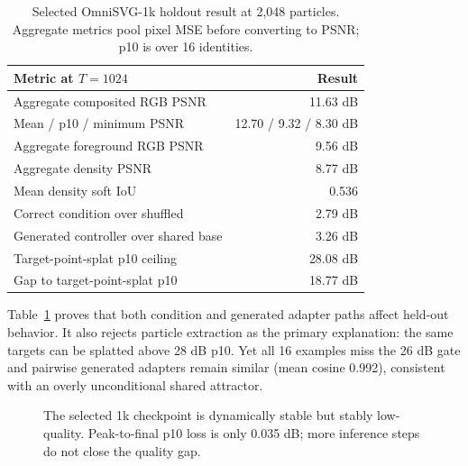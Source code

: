 \documentclass[sigconf,nonacm]{acmart}
\begin{document}
\begin{table}[t]
\caption{Selected OmniSVG-1k holdout result at 2,048 particles. Aggregate
metrics pool pixel MSE before converting to PSNR; p10 is over 16 identities.}
\label{tab:omnisvg-main}
\centering
\small
\begin{tabular}{lr}
\toprule
Metric at $T=1024$ & Result \\
\midrule
Aggregate composited RGB PSNR & 11.63 dB \\
Mean / p10 / minimum PSNR & 12.70 / 9.32 / 8.30 dB \\
Aggregate foreground RGB PSNR & 9.56 dB \\
Aggregate density PSNR & 8.77 dB \\
Mean density soft IoU & 0.536 \\
Correct condition over shuffled & 2.79 dB \\
Generated controller over shared base & 3.26 dB \\
Target-point-splat p10 ceiling & 28.08 dB \\
Gap to target-point-splat p10 & 18.77 dB \\
\bottomrule
\end{tabular}
\end{table}

Table~\ref{tab:omnisvg-main} proves that both condition and generated adapter
paths affect held-out behavior. It also rejects particle extraction as the
primary explanation: the same targets can be splatted above 28 dB p10. Yet
all 16 examples miss the 26 dB gate and pairwise generated adapters remain
similar (mean cosine 0.992), consistent with an overly unconditional shared
attractor.

\begin{figure}[t]
\centering
{}
\caption{The selected 1k checkpoint is dynamically stable but stably
low-quality. Peak-to-final p10 loss is only 0.035 dB; more inference steps do
not close the quality gap.}
\label{fig:horizons}
\end{figure}
\end{document}

